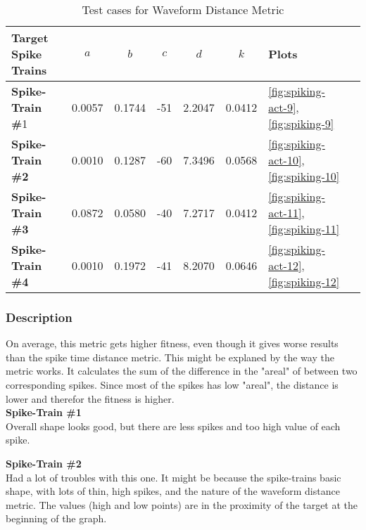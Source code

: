 \begin{table}[H]
	\begin{center}
		\begin{tabular}{ | l | c | c | c | c | c | l | l |}
	
	    \hline

			\textbf{Target Spike Trains} & \textbf{$a$} & \textbf{$b$} & \textbf{$c$} & \textbf{$d$} & \textbf{$k$} & \textbf{Plots}  \\ \hline 
			\textbf{Spike-Train \#}1 & 0.0057 & 0.1744 & -51 & 2.2047 & 0.0412 & \autoref{fig:spiking-act-9}, \autoref{fig:spiking-9} \\ \hline 
			\textbf{Spike-Train \#2} & 0.0010 & 0.1287 & -60 & 7.3496 & 0.0568 & \autoref{fig:spiking-act-10}, \autoref{fig:spiking-10} \\ \hline 
			\textbf{Spike-Train \#3} & 0.0872 & 0.0580 & -40 & 7.2717 & 0.0412 & \autoref{fig:spiking-act-11}, \autoref{fig:spiking-11} \\ \hline 
			\textbf{Spike-Train \#4} & 0.0010 & 0.1972 & -41 & 8.2070 & 0.0646 & \autoref{fig:spiking-act-12}, \autoref{fig:spiking-12}    \\ \hline 

	    \end{tabular}
	
	\end{center}
    \caption{Test cases for Waveform Distance Metric}
\end{table}

\subsubsection{Description}

On average, this metric gets higher fitness, even though it gives worse results than the spike time
distance metric. This might be explaned by the way the metric works. It calculates the sum of the 
difference in the "areal" of between two corresponding spikes. Since most of the spikes has low
"areal", the distance is lower and therefor the fitness is higher.   \\


\textbf{Spike-Train \#1} \\
Overall shape looks good, but there are less spikes and too high value of each spike. 


\textbf{Spike-Train \#2} \\
Had a lot of troubles with this one. It might be because the spike-trains basic shape, with
lots of thin, high spikes, and the nature of the waveform distance metric. The values (high and low points)
are in the proximity of the target at the beginning of the graph. \\


